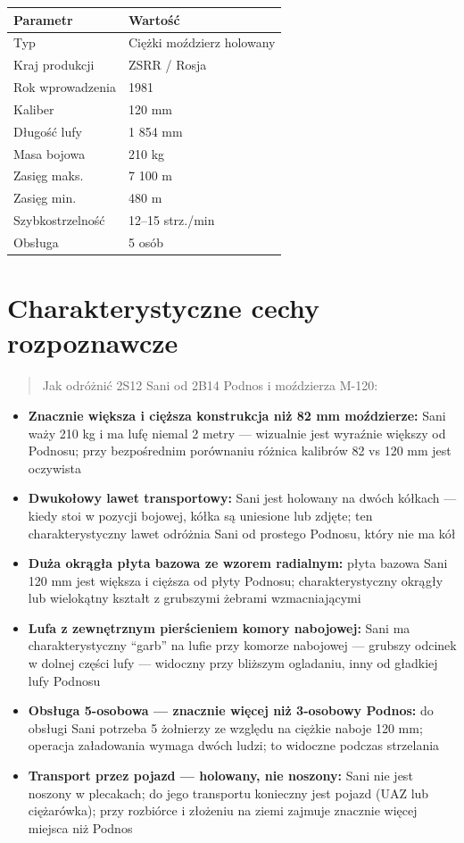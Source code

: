\documentclass[12pt,openany,oneside]{book}
\providecommand{\tightlist}{%
  \setlength{\itemsep}{0pt}\setlength{\parskip}{0pt}}
\begin{document}
\begin{longtable}[]{@{}ll@{}}
\toprule\noalign{}
Parametr & Wartość \\
\midrule\noalign{}
\endhead
\bottomrule\noalign{}
\endlastfoot
Typ & Ciężki moździerz holowany \\
Kraj produkcji & ZSRR / Rosja \\
Rok wprowadzenia & 1981 \\
Kaliber & 120 mm \\
Długość lufy & 1 854 mm \\
Masa bojowa & 210 kg \\
Zasięg maks. & 7 100 m \\
Zasięg min. & 480 m \\
Szybkostrzelność & 12--15 strz./min \\
Obsługa & 5 osób \\
\end{longtable}

\section{Charakterystyczne cechy
rozpoznawcze}\label{charakterystyczne-cechy-rozpoznawcze-26}

\begin{quote}
Jak odróżnić 2S12 Sani od 2B14 Podnos i moździerza M-120:
\end{quote}

\begin{itemize}
\tightlist
\item
  \textbf{Znacznie większa i cięższa konstrukcja niż 82 mm moździerze:}
  Sani waży 210 kg i ma lufę niemal 2 metry --- wizualnie jest wyraźnie
  większy od Podnosu; przy bezpośrednim porównaniu różnica kalibrów 82
  vs 120 mm jest oczywista
\item
  \textbf{Dwukołowy lawet transportowy:} Sani jest holowany na dwóch
  kółkach --- kiedy stoi w pozycji bojowej, kółka są uniesione lub
  zdjęte; ten charakterystyczny lawet odróżnia Sani od prostego Podnosu,
  który nie ma kół
\item
  \textbf{Duża okrągła płyta bazowa ze wzorem radialnym:} płyta bazowa
  Sani 120 mm jest większa i cięższa od płyty Podnosu; charakterystyczny
  okrągły lub wielokątny kształt z grubszymi żebrami wzmacniającymi
\item
  \textbf{Lufa z zewnętrznym pierścieniem komory nabojowej:} Sani ma
  charakterystyczny ``garb'' na lufie przy komorze nabojowej --- grubszy
  odcinek w dolnej części lufy --- widoczny przy bliższym ogladaniu,
  inny od gładkiej lufy Podnosu
\item
  \textbf{Obsługa 5-osobowa --- znacznie więcej niż 3-osobowy Podnos:}
  do obsługi Sani potrzeba 5 żołnierzy ze względu na ciężkie naboje 120
  mm; operacja załadowania wymaga dwóch ludzi; to widoczne podczas
  strzelania
\item
  \textbf{Transport przez pojazd --- holowany, nie noszony:} Sani nie
  jest noszony w plecakach; do jego transportu konieczny jest pojazd
  (UAZ lub ciężarówka); przy rozbiórce i złożeniu na ziemi zajmuje
  znacznie więcej miejsca niż Podnos
\end{itemize}
\end{document}
